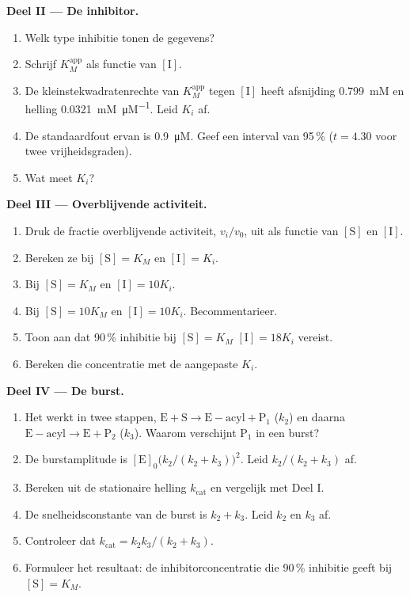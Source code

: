 \begin{problem}
\medskip\noindent\textbf{Deel II --- De inhibitor.}
\begin{enumerate}[resume]
  \item Welk type inhibitie tonen de gegevens?
  \item Schrijf $K_M^{\mathrm{app}}$ als functie van $[\mathrm I]$.
  \item De kleinstekwadratenrechte van $K_M^{\mathrm{app}}$ tegen $[\mathrm I]$ heeft afsnijding \qty{0.799}{mM} en
        helling \qty{0.0321}{mM.\micro M^{-1}}. Leid $K_i$ af.
  \item De standaardfout ervan is \qty{0.9}{\micro M}. Geef een interval
        van 95\,\% ($t = 4.30$ voor
        twee vrijheidsgraden).
  \item Wat meet $K_i$?
\end{enumerate}

\medskip\noindent\textbf{Deel III --- Overblijvende activiteit.}
\begin{enumerate}[resume]
  \item Druk de fractie overblijvende activiteit, $v_i/v_0$, uit als
        functie van $[\mathrm S]$ en
        $[\mathrm I]$.
  \item Bereken ze bij $[\mathrm S] = K_M$ en $[\mathrm I] = K_i$.
  \item Bij $[\mathrm S] = K_M$ en $[\mathrm I] = 10K_i$.
  \item Bij $[\mathrm S] = 10K_M$ en $[\mathrm I] = 10K_i$. Becommentarieer.
  \item Toon aan dat 90\,\% inhibitie bij $[\mathrm S] = K_M$ $[\mathrm I] = 18K_i$ vereist.
  \item Bereken die concentratie met de aangepaste $K_i$.
\end{enumerate}

\medskip\noindent\textbf{Deel IV --- De burst.}
\begin{enumerate}[resume]
  \item Het  werkt in twee stappen, $\mathrm{E + S \to E{-}acyl + P_1}$ ($k_2$) en daarna $\mathrm{E{-}acyl \to E +
        P_2}$ ($k_3$). Waarom verschijnt $\mathrm P_1$ in een burst?
  \item De burstamplitude is $[\mathrm E]_0\bigl(k_2/(k_2 + k_3)\bigr)^2$. Leid $k_2/(k_2 + k_3)$ af.
  \item Bereken uit de stationaire helling $k_{\mathrm{cat}}$ en vergelijk
        met Deel I.
  \item De snelheidsconstante van de burst is $k_2 + k_3$. Leid $k_2$ en $k_3$ af.
  \item Controleer dat $k_{\mathrm{cat}} = k_2k_3/(k_2 + k_3)$.
  \item Formuleer het resultaat: de inhibitorconcentratie die 90\,\%
        inhibitie geeft bij
        $[\mathrm S] = K_M$.
\end{enumerate}
\end{problem}
